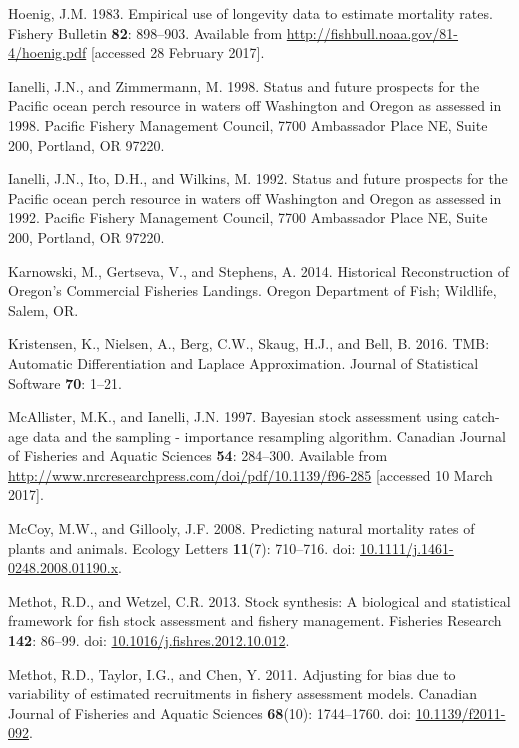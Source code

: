 \documentclass[12pt,]{article}
\begin{document}
\hypertarget{ref-hoenig_empirical_1983}{}
Hoenig, J.M. 1983. Empirical use of longevity data to estimate mortality
rates. Fishery Bulletin \textbf{82}: 898--903. Available from
\url{http://fishbull.noaa.gov/81-4/hoenig.pdf} {[}accessed 28 February
2017{]}.

\hypertarget{ref-ianelli_status_1998}{}
Ianelli, J.N., and Zimmermann, M. 1998. Status and future prospects for
the Pacific ocean perch resource in waters off Washington and Oregon as
assessed in 1998. Pacific Fishery Management Council, 7700 Ambassador
Place NE, Suite 200, Portland, OR 97220.

\hypertarget{ref-ianelli_status_1992}{}
Ianelli, J.N., Ito, D.H., and Wilkins, M. 1992. Status and future
prospects for the Pacific ocean perch resource in waters off Washington
and Oregon as assessed in 1992. Pacific Fishery Management Council, 7700
Ambassador Place NE, Suite 200, Portland, OR 97220.

\hypertarget{ref-karnowski_historical_2014}{}
Karnowski, M., Gertseva, V., and Stephens, A. 2014. Historical
Reconstruction of Oregon's Commercial Fisheries Landings. Oregon
Department of Fish; Wildlife, Salem, OR.

\hypertarget{ref-kristensen_tmb:_2016}{}
Kristensen, K., Nielsen, A., Berg, C.W., Skaug, H.J., and Bell, B. 2016.
TMB: Automatic Differentiation and Laplace Approximation. Journal of
Statistical Software \textbf{70}: 1--21.

\hypertarget{ref-mcallister_bayesian_1997}{}
McAllister, M.K., and Ianelli, J.N. 1997. Bayesian stock assessment
using catch-age data and the sampling - importance resampling algorithm.
Canadian Journal of Fisheries and Aquatic Sciences \textbf{54}:
284--300. Available from
\url{http://www.nrcresearchpress.com/doi/pdf/10.1139/f96-285}
{[}accessed 10 March 2017{]}.

\hypertarget{ref-mccoy_predicting_2008}{}
McCoy, M.W., and Gillooly, J.F. 2008. Predicting natural mortality rates
of plants and animals. Ecology Letters \textbf{11}(7): 710--716. doi:
\href{https://doi.org/10.1111/j.1461-0248.2008.01190.x}{10.1111/j.1461-0248.2008.01190.x}.

\hypertarget{ref-methot_stock_2013}{}
Methot, R.D., and Wetzel, C.R. 2013. Stock synthesis: A biological and
statistical framework for fish stock assessment and fishery management.
Fisheries Research \textbf{142}: 86--99. doi:
\href{https://doi.org/10.1016/j.fishres.2012.10.012}{10.1016/j.fishres.2012.10.012}.

\hypertarget{ref-methot_adjusting_2011}{}
Methot, R.D., Taylor, I.G., and Chen, Y. 2011. Adjusting for bias due to
variability of estimated recruitments in fishery assessment models.
Canadian Journal of Fisheries and Aquatic Sciences \textbf{68}(10):
1744--1760. doi:
\href{https://doi.org/10.1139/f2011-092}{10.1139/f2011-092}.
\end{document}
